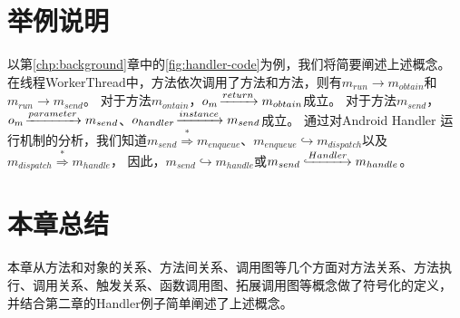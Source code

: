 	
	
\section{举例说明}

以第\ref{chp:background}章中的\autoref{fig:handler-code}为例，我们将简要阐述上述概念。
在线程WorkerThread中，方法依次调用了方法和方法，则有$m_{run} \to m_{obtain} $和$m_{run} \to m_{send}$。
对于方法$m_{ontain}$，$o_{m} \joinrel\xrightarrow{return} m_{obtain} $成立。
对于方法$m_{send}$，$o_{m} \joinrel\xrightarrow{parameter} m_{send} $、$o_{handler} \joinrel\xrightarrow{instance} m_{send} $成立。
通过对Android Handler 运行机制的分析，我们知道$m_{send} \stackrel{\ast	}{\Rightarrow} m_{enqueue} $、$m_{enqueue} \hookrightarrow m_{dispatch}$以及$m_{dispatch} \stackrel{\ast}{\Rightarrow}  m_{handle}$，
因此，$m_{send} \hookrightarrow m_{handle}$或$m_{send} \lhook\joinrel\xrightarrow{Handler}  m_{handle} $。




\section{本章总结}

本章从方法和对象的关系、方法间关系、调用图等几个方面对方法关系、方法执行、调用关系、触发关系、函数调用图、拓展调用图等概念做了符号化的定义，
并结合第二章的Handler例子简单阐述了上述概念。
